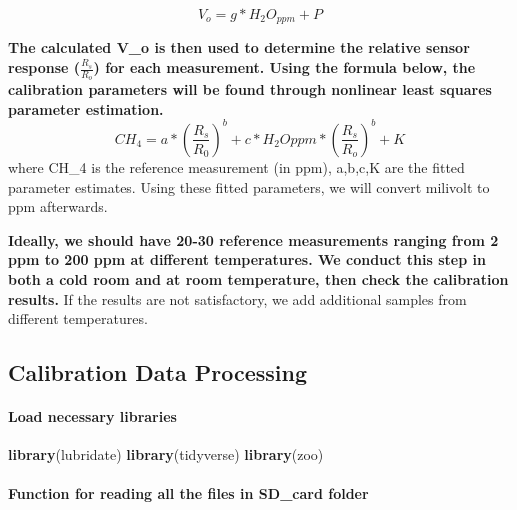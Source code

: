 \documentclass[
]{article}
\newenvironment{Shaded}{\begin{snugshade}}{\end{snugshade}}
\newcommand{\FunctionTok}[1]{\textcolor[rgb]{0.13,0.29,0.53}{\textbf{#1}}}
\newcommand{\NormalTok}[1]{#1}
\begin{document}
\[V_o = g * H_2O_{ppm}+ P\]

\textbf{The calculated V\_o is then used to determine the relative
sensor response (\(\frac{R_s}{R_o}\)) for each measurement. Using the
formula below, the calibration parameters will be found through
nonlinear least squares parameter estimation.}\\

\[CH_4 = a* \left(\frac{R_s}{R_0}\right)^b + c* H_2O{ppm}*\left(\frac{R_s}{R_o}\right)^b + K\]
where CH\_4 is the reference measurement (in ppm), a,b,c,K are the
fitted parameter estimates. Using these fitted parameters, we will
convert milivolt to ppm afterwards.

\textbf{Ideally, we should have 20-30 reference measurements ranging
from 2 ppm to 200 ppm at different temperatures. We conduct this step in
both a cold room and at room temperature, then check the calibration
results.} If the results are not satisfactory, we add additional samples
from different temperatures.\\

\hypertarget{calibration-data-processing}{%
\subsection{Calibration Data
Processing}\label{calibration-data-processing}}

\hypertarget{load-necessary-libraries}{%
\paragraph{Load necessary libraries}\label{load-necessary-libraries}}

\begin{Shaded}
\begin{Highlighting}[]
\FunctionTok{library}\NormalTok{(lubridate)}
\FunctionTok{library}\NormalTok{(tidyverse)}
\FunctionTok{library}\NormalTok{(zoo)}
\end{Highlighting}
\end{Shaded}

\hypertarget{function-for-reading-all-the-files-in-sd_card-folder}{%
\paragraph{Function for reading all the files in SD\_card
folder}\label{function-for-reading-all-the-files-in-sd_card-folder}}
\end{document}
